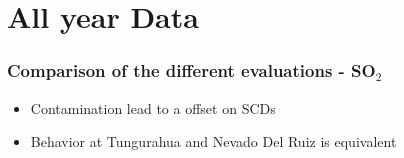 \documentclass{beamer} %
\begin{document}
\begin{frame}
\begin{multicols}{2}
			\end{multicols}
		\end{frame}
		
		
		
		\section{All year Data}
		\begin{frame}
			\frametitle{\color{mygreen}Comparison of the different evaluations - SO$_2$\\%
				\color{mygreen}{\rule{0.8\textwidth}{2pt}}}
			\begin{figure}[h!]	
			\end{figure}
			\pause
			\begin{multicols}{2}
				\begin{itemize}
					\item Contamination lead to a offset on  SCDs\\
					\newpage
					\pause
					\item Behavior at Tungurahua and Nevado Del Ruiz is equivalent
				\end{itemize}
			\end{multicols}
		\end{frame}
		
\end{document}
